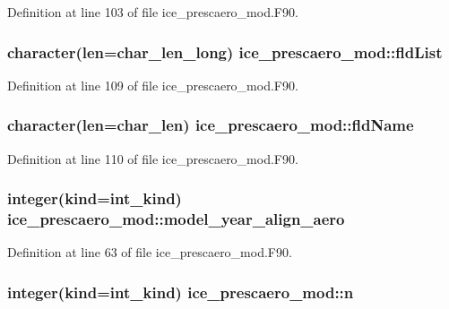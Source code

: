 Definition at line 103 of file ice\_\-prescaero\_\-mod.F90.\hypertarget{namespaceice__prescaero__mod_a3be7ab6e22248b38d141107dd0ee2a59}{
\subsubsection[{fldList}]{\setlength{\rightskip}{0pt plus 5cm}character(len=char\_\-len\_\-long) {\bf ice\_\-prescaero\_\-mod::fldList}}}
\label{namespaceice__prescaero__mod_a3be7ab6e22248b38d141107dd0ee2a59}


Definition at line 109 of file ice\_\-prescaero\_\-mod.F90.\hypertarget{namespaceice__prescaero__mod_a3ec9a560b31f3c5c6bc587e700ee9570}{
\subsubsection[{fldName}]{\setlength{\rightskip}{0pt plus 5cm}character(len=char\_\-len) {\bf ice\_\-prescaero\_\-mod::fldName}}}
\label{namespaceice__prescaero__mod_a3ec9a560b31f3c5c6bc587e700ee9570}


Definition at line 110 of file ice\_\-prescaero\_\-mod.F90.\hypertarget{namespaceice__prescaero__mod_a992cda048d40587ac16120bfa8691a42}{
\subsubsection[{model\_\-year\_\-align\_\-aero}]{\setlength{\rightskip}{0pt plus 5cm}integer(kind=int\_\-kind) {\bf ice\_\-prescaero\_\-mod::model\_\-year\_\-align\_\-aero}}}
\label{namespaceice__prescaero__mod_a992cda048d40587ac16120bfa8691a42}


Definition at line 63 of file ice\_\-prescaero\_\-mod.F90.\hypertarget{namespaceice__prescaero__mod_a9aac3151343a550064a4ea724d9cdb6f}{
\subsubsection[{n}]{\setlength{\rightskip}{0pt plus 5cm}integer(kind=int\_\-kind) {\bf ice\_\-prescaero\_\-mod::n}}}
\label{namespaceice__prescaero__mod_a9aac3151343a550064a4ea724d9cdb6f}


